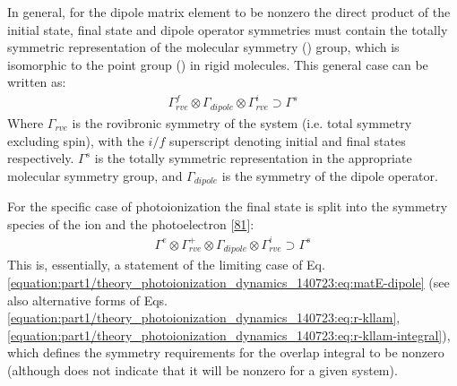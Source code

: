 \documentclass[letterpaper,table,10pt,english]{jupyterBook}
\begin{document}
\sphinxAtStartPar
In general, for the dipole matrix element to be non\sphinxhyphen{}zero the direct product of the initial state, final state and dipole operator symmetries must contain the totally symmetric representation of the molecular symmetry ({\hyperref[\detokenize{backmatter/glossary:term-MS}]{}}) group, which is isomorphic to the point group ({\hyperref[\detokenize{backmatter/glossary:term-PG}]{}}) in rigid molecules. This general case can be written as:
\begin{equation}\label{equation:part1/theory_symmetry_140723:eq:rovib-selection-symm}
\begin{split}
\Gamma_{rve}^{f}\otimes\Gamma_{dipole}\otimes\Gamma_{rve}^{i}\supset\Gamma^{s}
\end{split}
\end{equation}
\sphinxAtStartPar
Where \(\Gamma_{rve}\) is the rovibronic symmetry of the system (i.e. total symmetry excluding spin), with the \(i/f\) superscript denoting
initial and final states respectively. \(\Gamma^{s}\) is the totally symmetric representation in the appropriate molecular symmetry group,
and \(\Gamma_{dipole}\) is the symmetry of the dipole operator.

\sphinxAtStartPar
For the specific case of photoionization the final state is split into the symmetry species of the ion and the photoelectron {[}\hyperlink{cite.backmatter/bibliography:id869}{81}{]}:
\begin{equation}\label{equation:part1/theory_symmetry_140723:eq:ionization-symm}
\begin{split}
\Gamma^{e}\otimes\Gamma_{rve}^{+}\otimes\Gamma_{dipole}\otimes\Gamma_{rve}^{i}\supset\Gamma^{s}
\end{split}
\end{equation}
\sphinxAtStartPar
This is, essentially, a statement of the limiting case of Eq. \eqref{equation:part1/theory_photoionization_dynamics_140723:eq:matE-dipole} (see also alternative forms of Eqs. \eqref{equation:part1/theory_photoionization_dynamics_140723:eq:r-kllam}, \eqref{equation:part1/theory_photoionization_dynamics_140723:eq:r-kllam-integral}), which defines the symmetry requirements for the overlap integral to be non\sphinxhyphen{}zero (although does not indicate that it will be non\sphinxhyphen{}zero for a given system).
\end{document}
